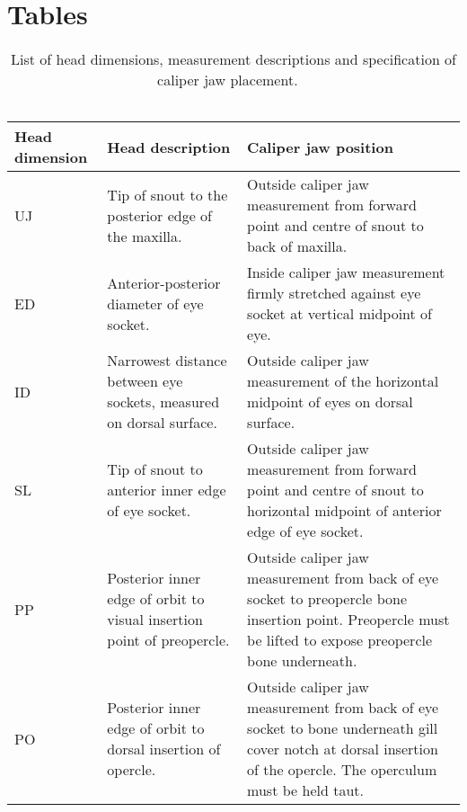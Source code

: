 \documentclass[12pt]{article}\usepackage[]{graphicx}\usepackage[]{color}
\begin{document}
\clearpage

\hypertarget{tables}{%
\section{Tables}\label{tables}}



\begin{table}[!h]

\caption{\label{tab:table1}List of head dimensions, measurement descriptions and specification of caliper jaw placement. ~\\
\hspace*{0.333em}\\}
\fontsize{10}{12}\selectfont
\begin{tabular}[t]{>{\raggedright\arraybackslash}p{1.9cm}>{\raggedright\arraybackslash}p{6.0cm}>{\raggedright\arraybackslash}p{7.5cm}}
\toprule
\textbf{Head dimension} & \textbf{Head description} & \textbf{Caliper jaw position}\\
\midrule
UJ & Tip of snout to the posterior edge of the maxilla. & Outside caliper jaw measurement from forward point and centre of snout to back of maxilla.\\
\midrule
ED & Anterior-posterior diameter of eye socket. & Inside caliper jaw measurement firmly stretched against eye socket at vertical midpoint of eye.\\
\midrule
ID & Narrowest distance between eye sockets, measured on dorsal surface. & Outside caliper jaw measurement of the horizontal midpoint of eyes on dorsal surface.\\
\midrule
SL & Tip of snout to anterior inner edge of eye socket. & Outside caliper jaw measurement from forward point and centre of snout to horizontal midpoint of anterior edge of eye socket.\\
\midrule
PP & Posterior inner edge of orbit to visual insertion point of preopercle. & Outside caliper jaw measurement from back of eye socket to preopercle bone insertion point. Preopercle must be lifted to expose preopercle bone underneath.\\
\midrule
\addlinespace
PO & Posterior inner edge of orbit to dorsal insertion of opercle. & Outside caliper jaw measurement from back of eye socket to bone underneath gill cover notch at dorsal insertion of the opercle.  The operculum must be held taut.\\
\bottomrule
\end{tabular}
\end{table}
~\\
\hspace*{0.333em}\\
\end{document}
